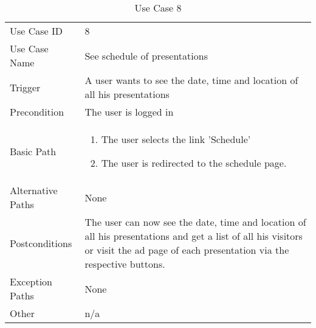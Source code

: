 \begin{table}[H]
\centering
\label{table-use-case-8}
\begin{tabular}{|p{3cm}|p{10cm}}
Use Case ID       & 8                                                         \\
Use Case Name     & See schedule of presentations                                       \\
Trigger           & A user wants to see the date, time and location of all his
presentations \\
Precondition      & The user is logged in               \\
Basic Path        & \begin{enumerate}
\item The user selects the link 'Schedule'  
\item The user is redirected to the schedule page. 
\end{enumerate} 
     \\
Alternative Paths & None                          \\
Postconditions    & The user can now see the date, time and location of all his
presentations and get a list of all his visitors or visit the ad page of each
presentation via the respective buttons. 		\\
Exception Paths   & None			\\
Other             & n/a                                                                                                                                                                                                        
\end{tabular}
\caption{Use Case 8}
\end{table}


